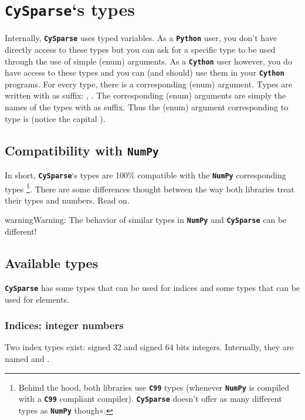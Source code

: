 \documentclass[letterpaper,10pt,english]{sphinxmanual}
\begin{document}
\chapter{\textbf{\texttt{CySparse}}`s types}
\label{types:cysparse-s-types}\label{types:cysparse-types}\label{types::doc}
Internally, \textbf{\texttt{CySparse}} uses typed variables. As a \textbf{\texttt{Python}} user, you don't have directly access to these types but you can ask for a specific type to be used through the use of simple (enum) arguments.
As a \textbf{\texttt{Cython}} user however, you do have access to these types and you can (and should) use them in your \textbf{\texttt{Cython}} programs. For every type, there is a corresponding (enum) argument. Types are written with
 as suffix: , . The corresponding (enum) arguments are simply the names of the types with  as suffix. Thus the (enum) argument corresponding to type  is 
(notice the capital ).


\section{Compatibility with \textbf{\texttt{NumPy}}}
\label{types:compatibility-with-numpy}
In short, \textbf{\texttt{CySparse}}`s types  are 100\% compatible with the \textbf{\texttt{NumPy}} corresponding types \footnote{
Behind the hood, both libraries use \textbf{\texttt{C99}} types (whenever \textbf{\texttt{NumPy}} is compiled with a \textbf{\texttt{C99}} compliant compiler).
\textbf{\texttt{CySparse}} doesn't offer as many different types as \textbf{\texttt{NumPy}} though«.
}.
There are some differences thought between the way both libraries treat their types and numbers. Read on.

\begin{notice}{warning}{Warning:}
The behavior of similar types in \textbf{\texttt{NumPy}} and \textbf{\texttt{CySparse}} can be different!
\end{notice}


\section{Available types}
\label{types:availabe-types}\label{types:available-types}
\textbf{\texttt{CySparse}} has some types that can be used for indices and some types that can be used for elements.


\subsection{Indices: integer numbers}
\label{types:indices-integer-numbers}
Two index types exist: signed 32 and signed 64 bits integers. Internally, they are named  and .
\end{document}
